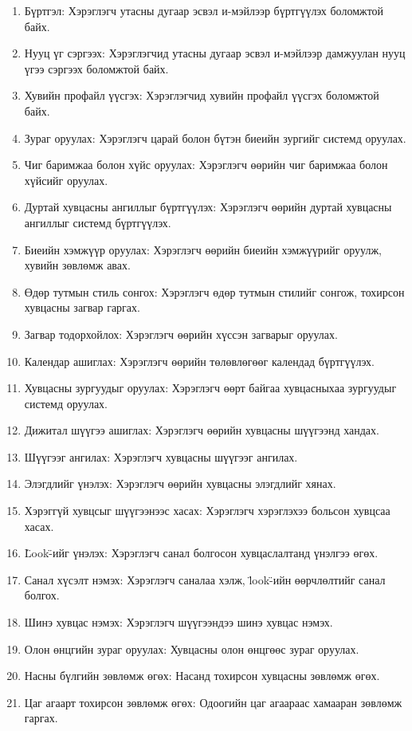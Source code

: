 \begin{enumerate}

  \item Бүртгэл: Хэрэглэгч утасны дугаар эсвэл и-мэйлээр бүртгүүлэх боломжтой байх.
  \item Нууц үг сэргээх: Хэрэглэгчид утасны дугаар эсвэл и-мэйлээр дамжуулан нууц үгээ сэргээх боломжтой байх.
  \item Хувийн профайл үүсгэх: Хэрэглэгчид хувийн профайл үүсгэх боломжтой байх.
  \item Зураг оруулах: Хэрэглэгч царай болон бүтэн биеийн зургийг системд оруулах.
  \item Чиг баримжаа болон хүйс оруулах: Хэрэглэгч өөрийн чиг баримжаа болон хүйсийг оруулах.
  \item Дуртай хувцасны ангиллыг бүртгүүлэх: Хэрэглэгч өөрийн дуртай хувцасны ангиллыг системд бүртгүүлэх.
  \item Биеийн хэмжүүр оруулах: Хэрэглэгч өөрийн биеийн хэмжүүрийг оруулж, хувийн зөвлөмж авах.
  \item Өдөр тутмын стиль сонгох: Хэрэглэгч өдөр тутмын стилийг сонгож, тохирсон хувцасны загвар гаргах.
  \item Загвар тодорхойлох: Хэрэглэгч өөрийн хүссэн загварыг оруулах.
  \item Календар ашиглах: Хэрэглэгч өөрийн төлөвлөгөөг календад бүртгүүлэх.
  \item Хувцасны зургуудыг оруулах: Хэрэглэгч өөрт байгаа хувцасныхаа зургуудыг системд оруулах.
  \item Дижитал шүүгээ ашиглах: Хэрэглэгч өөрийн хувцасны шүүгээнд хандах.
  \item Шүүгээг ангилах: Хэрэглэгч хувцасны шүүгээг ангилах.
  \item Элэгдлийг үнэлэх: Хэрэглэгч өөрийн хувцасны элэгдлийг хянах.
  \item Хэрэггүй хувцсыг шүүгээнээс хасах: Хэрэглэгч хэрэглэхээ больсон хувцсаа хасах.
  \item \"Look\"-ийг үнэлэх: Хэрэглэгч санал болгосон хувцаслалтанд үнэлгээ өгөх.
  \item Санал хүсэлт нэмэх: Хэрэглэгч саналаа хэлж, \"look\"-ийн өөрчлөлтийг санал болгох.
  \item Шинэ хувцас нэмэх: Хэрэглэгч шүүгээндээ шинэ хувцас нэмэх.
  \item Олон өнцгийн зураг оруулах: Хувцасны олон өнцгөөс зураг оруулах.
  \item Насны бүлгийн зөвлөмж өгөх: Насанд тохирсон хувцасны зөвлөмж өгөх.
  \item Цаг агаарт тохирсон зөвлөмж өгөх: Одоогийн цаг агаараас хамааран зөвлөмж гаргах.

\end{enumerate}
